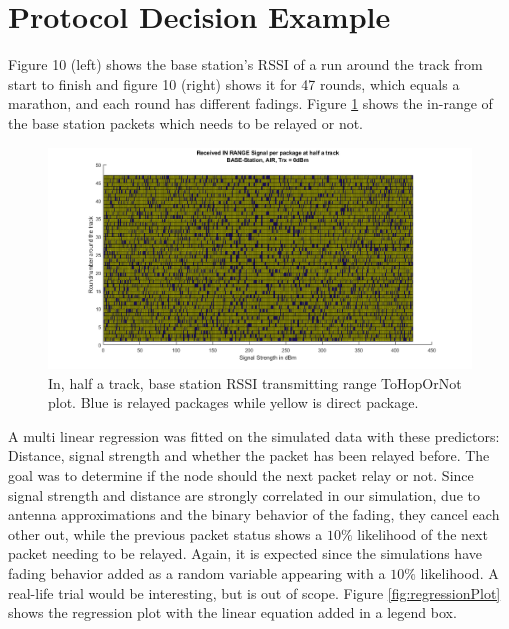 \section{Protocol Decision Example}\label{sc:protocolDecisionExample}
Figure 10 (left) shows the base station's RSSI of a run around the track from start to finish and figure 10 (right) shows it for 47 rounds, which equals a marathon, and each round has different fadings. Figure \ref{fig:recievedSignal_inRange_halfTrack} shows the in-range of the base station packets which needs to be relayed or not.


\begin{figure}[H]
	\centering
	\includegraphics[width=\linewidth]{theory/protocolDecisionExample/fig/recievedSignal_inRange_halfTrack.png}
	\caption{In, half a track, base station RSSI transmitting range ToHopOrNot plot. Blue is relayed packages while yellow is direct package.}
	\label{fig:recievedSignal_inRange_halfTrack}
\end{figure}

A multi linear regression was fitted on the simulated data with these predictors: Distance, signal strength and whether the packet has been relayed before. The goal was to determine if the node should the next packet relay or not. Since signal strength and distance are strongly correlated in our simulation, due to antenna approximations and the binary behavior of the fading, they cancel each other out, while the previous packet status shows a $10\%$ likelihood of the next packet needing to be relayed. Again, it is expected since the simulations have fading behavior added as a random variable appearing with a $10\%$ likelihood. A real-life trial would be interesting, but is out of scope. Figure \ref{fig:regressionPlot} shows the regression plot with the linear equation added in a legend box.

